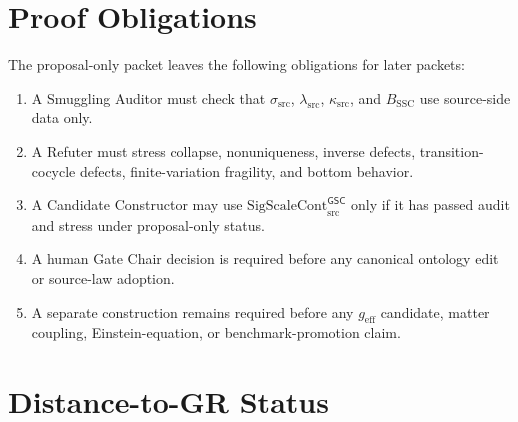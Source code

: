 \documentclass[11pt]{article}
\newcommand{\geff}{g_{\mathrm{eff}}}
\newcommand{\SigScaleCont}{\mathrm{SigScaleCont}_{\mathrm{src}}^{\mathsf{GSC}}}
\newcommand{\SigTok}{\sigma_{\mathrm{src}}}
\newcommand{\ScaleTok}{\lambda_{\mathrm{src}}}
\newcommand{\ContTok}{\kappa_{\mathrm{src}}}
\begin{document}
\section{Proof Obligations}

The proposal-only packet leaves the following obligations for later packets:
\begin{enumerate}[leftmargin=*]
  \item A Smuggling Auditor must check that \(\SigTok\), \(\ScaleTok\),
  \(\ContTok\), and \(B_{\mathrm{SSC}}\) use source-side data only.
  \item A Refuter must stress collapse, nonuniqueness, inverse defects,
  transition-cocycle defects, finite-variation fragility, and bottom behavior.
  \item A Candidate Constructor may use \(\SigScaleCont\) only if it has
  passed audit and stress under proposal-only status.
  \item A human Gate Chair decision is required before any canonical ontology
  edit or source-law adoption.
  \item A separate construction remains required before any \(\geff\)
  candidate, matter coupling, Einstein-equation, or benchmark-promotion claim.
\end{enumerate}

\section{Distance-to-GR Status}
\end{document}
